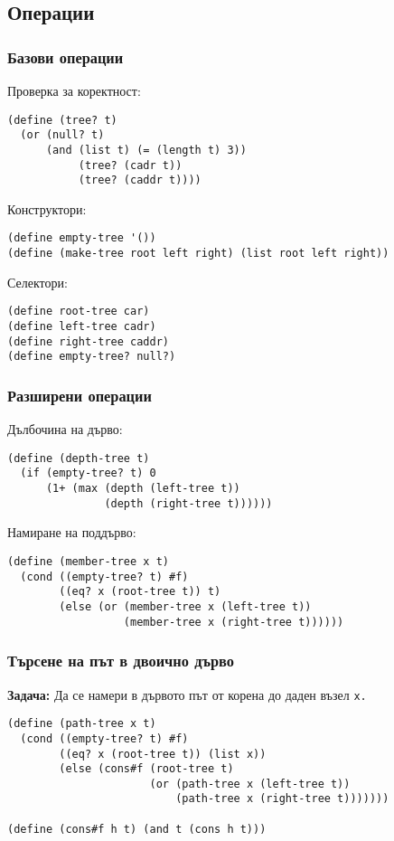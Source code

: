 \documentclass{beamer}
\begin{document}
\subsection{Операции}

\begin{frame}[fragile]
  \frametitle{Базови операции}

  Проверка за коректност:
  \pause
\begin{verbatim}
(define (tree? t)
  (or (null? t)
      (and (list t) (= (length t) 3))
           (tree? (cadr t))
           (tree? (caddr t))))
\end{verbatim}
  \pause
  Конструктори:
  \pause
\begin{verbatim}
(define empty-tree '())
(define (make-tree root left right) (list root left right))
\end{verbatim}
  \pause
  Селектори:
  \pause
\begin{verbatim}
(define root-tree car)
(define left-tree cadr)
(define right-tree caddr)
(define empty-tree? null?)
\end{verbatim}
\end{frame}

\begin{frame}
  \frametitle{Разширени операции}

  Дълбочина на дърво:
  \pause
\begin{verbatim}
(define (depth-tree t)
  (if (empty-tree? t) 0
      (1+ (max (depth (left-tree t))
               (depth (right-tree t))))))
\end{verbatim}
  \pause
  Намиране на поддърво:
  \pause
\begin{verbatim}
(define (member-tree x t)
  (cond ((empty-tree? t) #f)
        ((eq? x (root-tree t)) t)
        (else (or (member-tree x (left-tree t))
                  (member-tree x (right-tree t))))))
\end{verbatim}
\end{frame}

\begin{frame}[fragile]
  \frametitle{Търсене на път в двоично дърво}

  \textbf{Задача:} Да се намери в дървото път от корена до даден възел \tt x.
  \pause
\begin{verbatim}
(define (path-tree x t)
  (cond ((empty-tree? t) #f)
        ((eq? x (root-tree t)) (list x))
        (else (cons#f (root-tree t)
                      (or (path-tree x (left-tree t))
                          (path-tree x (right-tree t)))))))

(define (cons#f h t) (and t (cons h t)))
\end{verbatim}
\end{frame}
\end{document}
